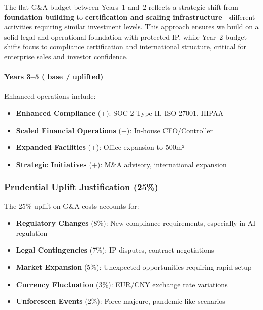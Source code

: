 \documentclass[11pt, a4paper, oneside]{article}
\begin{document}
The flat G\&A budget between Years~1 and~2 reflects a strategic shift from \textbf{foundation building} to \textbf{certification and scaling infrastructure}---different activities requiring similar investment levels. This approach ensures we build on a solid legal and operational foundation with protected IP, while Year~2 budget shifts focus to compliance certification and international structure, critical for enterprise sales and investor confidence.

\paragraph{Years 3--5 ( base /  uplifted)}
Enhanced operations include:
\begin{itemize}
    \item \textbf{Enhanced Compliance} (+): SOC 2 Type II, ISO 27001, HIPAA
    \item \textbf{Scaled Financial Operations} (+): In-house CFO/Controller
    \item \textbf{Expanded Facilities} (+): Office expansion to 500m²
    \item \textbf{Strategic Initiatives} (+): M\&A advisory, international expansion
\end{itemize}

\subsubsection{Prudential Uplift Justification (25\%)}
The 25\% uplift on G\&A costs accounts for:
\begin{itemize}
    \item \textbf{Regulatory Changes} (8\%): New compliance requirements, especially in AI regulation
    \item \textbf{Legal Contingencies} (7\%): IP disputes, contract negotiations
    \item \textbf{Market Expansion} (5\%): Unexpected opportunities requiring rapid setup
    \item \textbf{Currency Fluctuation} (3\%): EUR/CNY exchange rate variations
    \item \textbf{Unforeseen Events} (2\%): Force majeure, pandemic-like scenarios
\end{itemize}
\end{document}
